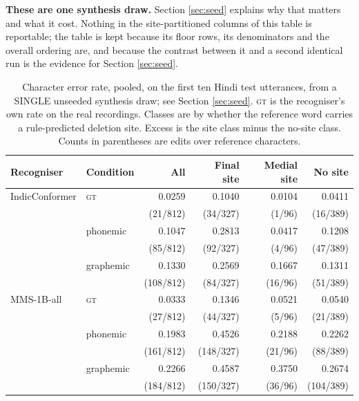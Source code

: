 \documentclass[runningheads]{llncs}
\begin{document}
\textbf{These are one synthesis draw.} Section \ref{sec:seed} explains why
that matters and what it cost. Nothing in the site-partitioned columns of this
table is reportable; the table is kept because its floor rows, its
denominators and the overall ordering are, and because the contrast between it
and a second identical run is the evidence for Section \ref{sec:seed}.

\begin{table}[t]
\centering
\caption{Character error rate, pooled, on the first ten Hindi test utterances,
from a SINGLE unseeded synthesis draw; see Section \ref{sec:seed}.
\textsc{gt} is the recogniser's own rate on the real recordings. Classes are
by whether the reference word carries a rule-predicted deletion site. Excess is
the site class minus the no-site class. Counts in parentheses are edits over
reference characters.}
\label{tab:intel}
\begin{tabular}{llrrrr}
\toprule
Recogniser & Condition & All & Final site & Medial site & No site \\
\midrule
IndicConformer & \textsc{gt} & 0.0259 & 0.1040 & 0.0104 & 0.0411 \\
               &             & (21/812) & (34/327) & (1/96) & (16/389) \\
               & phonemic    & 0.1047 & 0.2813 & 0.0417 & 0.1208 \\
               &             & (85/812) & (92/327) & (4/96) & (47/389) \\
               & graphemic   & 0.1330 & 0.2569 & 0.1667 & 0.1311 \\
               &             & (108/812) & (84/327) & (16/96) & (51/389) \\
\midrule
MMS-1B-all     & \textsc{gt} & 0.0333 & 0.1346 & 0.0521 & 0.0540 \\
               &             & (27/812) & (44/327) & (5/96) & (21/389) \\
               & phonemic    & 0.1983 & 0.4526 & 0.2188 & 0.2262 \\
               &             & (161/812) & (148/327) & (21/96) & (88/389) \\
               & graphemic   & 0.2266 & 0.4587 & 0.3750 & 0.2674 \\
               &             & (184/812) & (150/327) & (36/96) & (104/389) \\
\bottomrule
\end{tabular}
\end{table}
\end{document}
